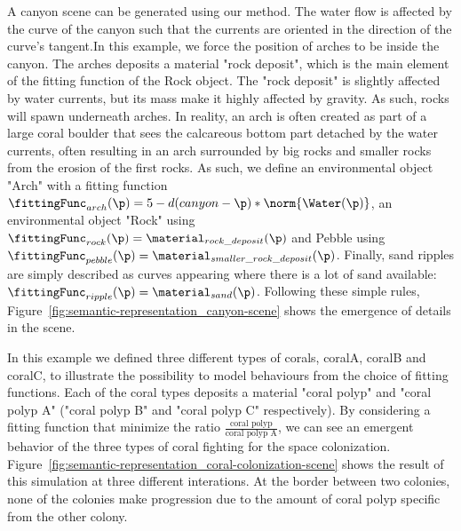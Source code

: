 A canyon scene can be generated using our method. The water flow is affected by the curve of the canyon such that the currents are oriented in the direction of the curve's tangent.In this example, we force the position of arches to be inside the canyon. The arches deposits a material "rock deposit", which is the main element of the fitting function of the Rock object. The "rock deposit" is slightly affected by water currents, but its mass make it highly affected by gravity. As such, rocks will spawn underneath arches. In reality, an arch is often created as part of a large coral boulder that sees the calcareous bottom part detached by the water currents, often resulting in an arch surrounded by big rocks and smaller rocks from the erosion of the first rocks.
As such, we define an environmental object "Arch" with a fitting function $\fittingFunc_{arch}(\p) = 5 - d(canyon - \p) * \norm{\Water(\p)}$, an environmental object "Rock" using $\fittingFunc_{rock}(\p) = \material_{rock\_deposit}(\p)$ and Pebble using $\fittingFunc_{pebble}(\p) = \material_{smaller\_rock\_deposit}(\p)$. Finally, sand ripples are simply described as curves appearing where there is a lot of sand available: $\fittingFunc_{ripple}(\p) = \material_{sand}(\p)$.
Following these simple rules, Figure~\ref{fig:semantic-representation_canyon-scene} shows the emergence of details in the scene. 

In this example we defined three different types of corals, coralA, coralB and coralC, to illustrate the possibility to model behaviours from the choice of fitting functions. Each of the coral types deposits a material "coral polyp" and "coral polyp A" ("coral polyp B" and "coral polyp C" respectively). By considering a fitting function that minimize the ratio $\frac{\text{coral polyp}}{\text{coral polyp A}}$, we can see an emergent behavior of the three types of coral fighting for the space colonization.
Figure~\ref{fig:semantic-representation_coral-colonization-scene} shows the result of this simulation at three different interations. At the border between two colonies, none of the colonies make progression due to the amount of coral polyp specific from the other colony.

